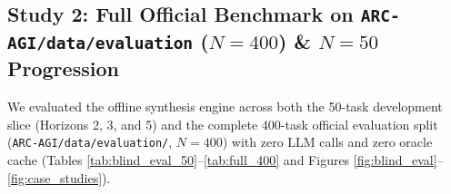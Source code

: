 \documentclass[10pt,a4paper]{article}
\begin{document}
\subsection{Study 2: Full Official Benchmark on \texttt{ARC-AGI/data/evaluation} ($N=400$) \& $N=50$ Progression}

We evaluated the offline synthesis engine across both the 50-task development slice (Horizons 2, 3, and 5) and the complete 400-task official evaluation split (\texttt{ARC-AGI/data/evaluation/}, $N=400$) with zero LLM calls and zero oracle cache (Tables \ref{tab:blind_eval_50}--\ref{tab:full_400} and Figures \ref{fig:blind_eval}--\ref{fig:case_studies}).

\begin{table}[htbp]
\centering
\caption{\textbf{Progression across Horizons 2, 3, and 5 on the $N=50$ evaluation slice (\texttt{ARC-AGI/data/evaluation}).} All $19$ tasks solved on training demonstrations in Horizon 5 transferred with $100\%$ exact accuracy to the unseen test grids.}
\label{tab:blind_eval_50}
\end{table}
\end{document}
